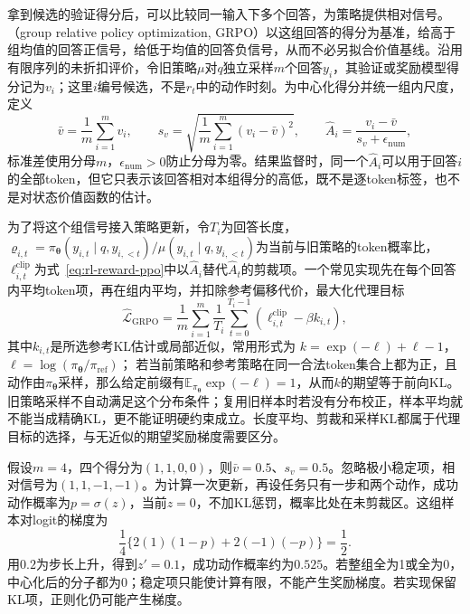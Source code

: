 拿到候选的验证得分后，可以比较同一输入下多个回答，为策略提供相对信号。（group relative policy optimization, GRPO）以这组回答的得分为基准，给高于组均值的回答正信号，给低于均值的回答负信号，从而不必另拟合价值基线。沿用有限序列的未折扣评价，令旧策略$\mu$对$q$独立采样$m$个回答$y_i$，其验证或奖励模型得分记为$v_i$；这里$i$编号候选，不是$r_t$中的动作时刻。为中心化得分并统一组内尺度，定义
\begin{equation}
  \bar v=\frac1m\sum_{i=1}^m v_i,\qquad
  s_v=\sqrt{\frac1m\sum_{i=1}^m(v_i-\bar v)^2},\qquad
  \widehat A_i=\frac{v_i-\bar v}{s_v+\epsilon_{\mathrm{num}}},
  \label{eq:rl-reward-grpo-advantage}
\end{equation}
标准差使用分母$m$，$\epsilon_{\mathrm{num}}>0$防止分母为零。结果监督时，同一个$\widehat A_i$可以用于回答$i$的全部token，但它只表示该回答相对本组得分的高低，既不是逐token标签，也不是对状态价值函数的估计。

为了将这个组信号接入策略更新，令$T_i$为回答长度，$\varrho_{i,t}=\pi_{\bm{\theta}}(y_{i,t}\mid q,y_{i,<t})/
\mu(y_{i,t}\mid q,y_{i,<t})$为当前与旧策略的token概率比，$\ell_{i,t}^{\mathrm{clip}}$为式~\eqref{eq:rl-reward-ppo}中以$\widehat A_i$替代$\widehat A_t$的剪裁项。一个常见实现先在每个回答内平均token项，再在组内平均，并扣除参考偏移代价，最大化代理目标
\begin{equation}
  \widehat{\mathcal L}_{\mathrm{GRPO}}
  =\frac1m\sum_{i=1}^m\frac1{T_i}
      \sum_{t=0}^{T_i-1}
       \left(\ell_{i,t}^{\mathrm{clip}}-\beta k_{i,t}\right),
  \label{eq:rl-reward-grpo}
\end{equation}
其中$k_{i,t}$是所选参考KL估计或局部近似，常用形式为
$k=\exp(-\ell)+\ell-1$，$\ell=\log(\pi_{\bm{\theta}}/\pi_{\mathrm{ref}})$；
若当前策略和参考策略在同一合法token集合上都为正，且动作由$\pi_{\bm{\theta}}$采样，那么给定前缀有$\mathbb E_{\pi_{\bm{\theta}}}\exp(-\ell)=1$，从而$k$的期望等于前向KL。旧策略采样不自动满足这个分布条件；复用旧样本时若没有分布校正，样本平均就不能当成精确KL，更不能证明硬约束成立。长度平均、剪裁和采样KL都属于代理目标的选择，与无近似的期望奖励梯度需要区分。

\begin{example}[一组验证得分的更新信号]
  \label{ex:rl-reward-grpo}
  假设$m=4$，四个得分为$(1,1,0,0)$，则$\bar v=0.5$、$s_v=0.5$。忽略极小稳定项，相对信号为$(1,1,-1,-1)$。为计算一次更新，再设任务只有一步和两个动作，成功动作概率为$p=\sigma(z)$，当前$z=0$，不加KL惩罚，概率比处在未剪裁区。这组样本对logit的梯度为
  \[
    \frac14\{2(1)(1-p)+2(-1)(-p)\}=\frac12.
  \]
  用$0.2$为步长上升，得到$z'=0.1$，成功动作概率约为$0.525$。若整组全为1或全为0，中心化后的分子都为0；稳定项只能使计算有限，不能产生奖励梯度。若实现保留KL项，正则化仍可能产生梯度。
\end{example}


